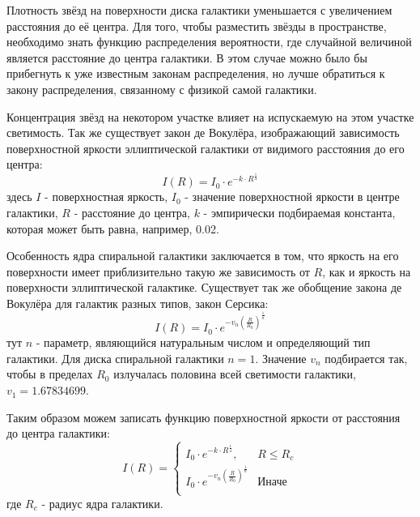 Плотность звёзд на поверхности диска галактики уменьшается с увеличением расстояния до её центра. Для того, чтобы разместить звёзды в пространстве, необходимо знать функцию распределения вероятности, где случайной величиной является расстояние до центра галактики. В этом случае можно было бы прибегнуть к уже известным законам распределения, но лучше обратиться к закону распределения, связанному с физикой самой галактики.

Концентрация звёзд на некотором участке влияет на испускаемую на этом участке светимость. Так же существует закон де Вокулёра, изображающий зависимость поверхностной яркости эллиптической галактики от видимого расстояния до его центра\cite{beltoforion}:
\begin{equation}
    I(R) = I_0 \cdot{} e^{-k\cdot{}R^\frac{1}{4}}
\end{equation}
здесь $I$ - поверхностная яркость, $I_0$ - значение поверхностной яркости в центре галактики, $R$ - расстояние до центра, $k$ - эмпирически подбираемая константа, которая может быть равна, например, 0.02.

Особенность ядра спиральной галактики заключается в том, что яркость на его поверхности имеет приблизительно такую же зависимость от $R$, как и яркость на поверхности эллиптической галактике. Существует так же обобщение закона де Вокулёра для галактик разных типов, закон Серсика\cite{beltoforion}:
\begin{equation}
    I(R) = I_0 \cdot{} e^{-v_n(\frac{R}{R_0})^\frac{1}{n}}
\end{equation}
тут $n$ - параметр, являющийся натуральным числом и определяющий тип галактики. Для диска спиральной галактики $n = 1$. Значение $v_n$ подбирается так, чтобы в пределах $R_0$ излучалась половина всей светимости галактики, $v_1 = 1.67834699$.

Таким образом можем записать функцию поверхностной яркости от расстояния до центра галактики:
\begin{equation}
    I(R) = \left\{ \begin{array}{ll}
        I_0 \cdot{} e^{-k\cdot{}R^\frac{1}{4}},         & \textrm{$R \leq{} R_c$}\\
        I_0 \cdot{} e^{-v_n(\frac{R}{R_0})^\frac{1}{n}} & \textrm{Иначе}\\
                   \end{array} \right.
\end{equation}
где $R_c$ - радиус ядра галактики.

